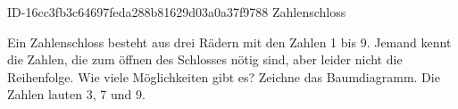 \begin{exercise}
      {ID-16cc3fb3c64697feda288b81629d03a0a37f9788}
      {Zahlenschloss}
  \ifproblem\problem\par
    Ein Zahlenschloss besteht aus drei Rädern mit den Zahlen 1 bis 9. Jemand kennt
    die Zahlen, die zum öffnen des Schlosses nötig sind, aber leider nicht die
    Reihenfolge. Wie viele Möglichkeiten gibt es? Zeichne das Baumdiagramm.
    Die Zahlen lauten 3, 7 und 9.
  \fi
\end{exercise}
